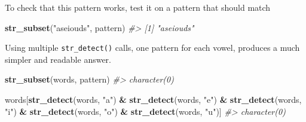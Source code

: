 \documentclass[]{book}
\newenvironment{Shaded}{\begin{snugshade}}{\end{snugshade}}
\newcommand{\CommentTok}[1]{\textcolor[rgb]{0.56,0.35,0.01}{\textit{#1}}}
\newcommand{\ControlFlowTok}[1]{\textcolor[rgb]{0.13,0.29,0.53}{\textbf{#1}}}
\newcommand{\DataTypeTok}[1]{\textcolor[rgb]{0.13,0.29,0.53}{#1}}
\newcommand{\DecValTok}[1]{\textcolor[rgb]{0.00,0.00,0.81}{#1}}
\newcommand{\KeywordTok}[1]{\textcolor[rgb]{0.13,0.29,0.53}{\textbf{#1}}}
\newcommand{\NormalTok}[1]{#1}
\newcommand{\OperatorTok}[1]{\textcolor[rgb]{0.81,0.36,0.00}{\textbf{#1}}}
\newcommand{\StringTok}[1]{\textcolor[rgb]{0.31,0.60,0.02}{#1}}
\theoremstyle{plain}
\theoremstyle{remark}
\begin{document}
\begin{enumerate}
\begin{Shaded}
\end{Shaded}

  To check that this pattern works, test it on a pattern that should
  match

\begin{Shaded}
\begin{Highlighting}[]
\KeywordTok{str_subset}\NormalTok{(}\StringTok{"aseiouds"}\NormalTok{, pattern)}
\CommentTok{#> [1] "aseiouds"}
\end{Highlighting}
\end{Shaded}

  Using multiple \texttt{str\_detect()} calls, one pattern for each
  vowel, produces a much simpler and readable answer.

\begin{Shaded}
\begin{Highlighting}[]
\KeywordTok{str_subset}\NormalTok{(words, pattern)}
\CommentTok{#> character(0)}

\NormalTok{words[}\KeywordTok{str_detect}\NormalTok{(words, }\StringTok{"a"}\NormalTok{) }\OperatorTok{&}
\StringTok{      }\KeywordTok{str_detect}\NormalTok{(words, }\StringTok{"e"}\NormalTok{) }\OperatorTok{&}
\StringTok{      }\KeywordTok{str_detect}\NormalTok{(words, }\StringTok{"i"}\NormalTok{) }\OperatorTok{&}
\StringTok{      }\KeywordTok{str_detect}\NormalTok{(words, }\StringTok{"o"}\NormalTok{) }\OperatorTok{&}
\StringTok{      }\KeywordTok{str_detect}\NormalTok{(words, }\StringTok{"u"}\NormalTok{)]}
\CommentTok{#> character(0)}
\end{Highlighting}
\end{Shaded}


\end{enumerate}
\end{document}

